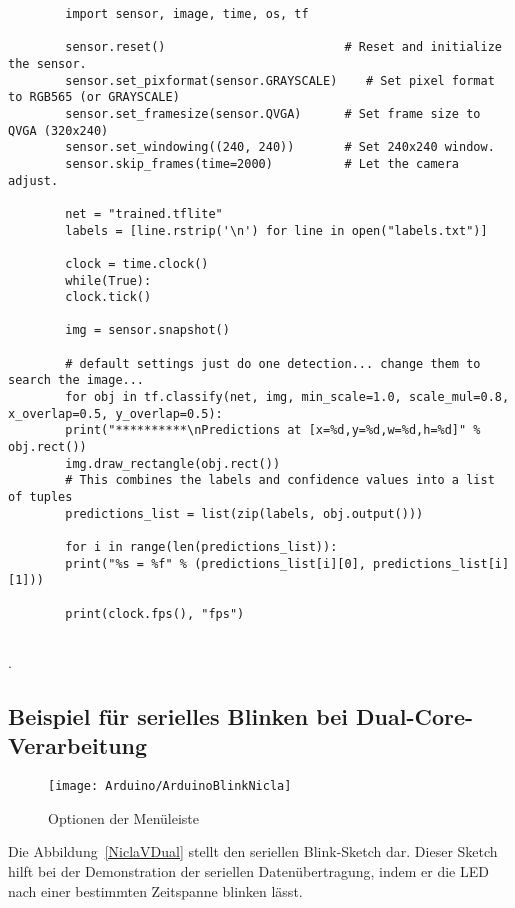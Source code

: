 	\begin{verbatim}
		import sensor, image, time, os, tf
		
		sensor.reset()                         # Reset and initialize the sensor.
		sensor.set_pixformat(sensor.GRAYSCALE)    # Set pixel format to RGB565 (or GRAYSCALE)
		sensor.set_framesize(sensor.QVGA)      # Set frame size to QVGA (320x240)
		sensor.set_windowing((240, 240))       # Set 240x240 window.
		sensor.skip_frames(time=2000)          # Let the camera adjust.
		
		net = "trained.tflite"
		labels = [line.rstrip('\n') for line in open("labels.txt")]
		
		clock = time.clock()
		while(True):
		clock.tick()
		
		img = sensor.snapshot()
		
		# default settings just do one detection... change them to search the image...
		for obj in tf.classify(net, img, min_scale=1.0, scale_mul=0.8, x_overlap=0.5, y_overlap=0.5):
		print("**********\nPredictions at [x=%d,y=%d,w=%d,h=%d]" % obj.rect())
		img.draw_rectangle(obj.rect())
		# This combines the labels and confidence values into a list of tuples
		predictions_list = list(zip(labels, obj.output()))
		
		for i in range(len(predictions_list)):
		print("%s = %f" % (predictions_list[i][0], predictions_list[i][1]))
		
		print(clock.fps(), "fps")
		
	\end{verbatim}




.
\subsection{Beispiel für serielles Blinken bei Dual-Core-Verarbeitung}


\begin{figure}[H]
    \centering
    
    \texttt{[image: Arduino/ArduinoBlinkNicla]}
    
    \caption{Optionen der Menüleiste}\label{ArduinoIDEOptions}
\end{figure}





Die Abbildung~\ref{NiclaVDual} stellt den seriellen Blink-Sketch dar. Dieser Sketch hilft bei der Demonstration der seriellen Datenübertragung, indem er die LED nach einer bestimmten Zeitspanne blinken lässt. 

